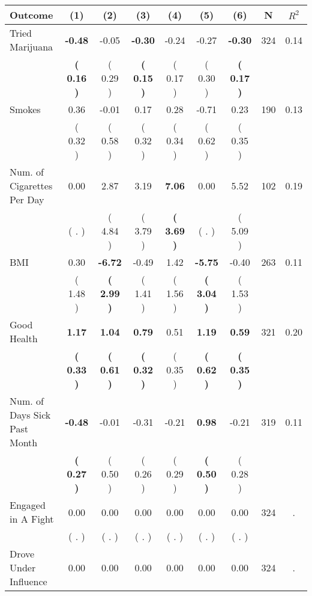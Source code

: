 \begin{tabular}{lcccccccc}
\toprule
 \textbf{Outcome} & \textbf{(1)} & \textbf{(2)} & \textbf{(3)} & \textbf{(4)} & \textbf{(5)} & \textbf{(6)} & \textbf{N} & \textbf{$ R^2$} \\
\midrule
Tried Marijuana & \textbf{    -0.48} &     -0.05 & \textbf{    -0.30} &     -0.24 &     -0.27 & \textbf{    -0.30} & 324 &       0.14 \\ 
 & \textbf{(     0.16 )} & (     0.29 ) & \textbf{(     0.15 )} & (     0.17 ) & (     0.30 ) & \textbf{(     0.17 )} & \\
Smokes &      0.36 &     -0.01 &      0.17 &      0.28 &     -0.71 &      0.23 & 190 &       0.13 \\ 
 & (     0.32 ) & (     0.58 ) & (     0.32 ) & (     0.34 ) & (     0.62 ) & (     0.35 ) & \\
Num. of Cigarettes Per Day &      0.00 &      2.87 &      3.19 & \textbf{     7.06} &      0.00 &      5.52 & 102 &       0.19 \\ 
 & (        . ) & (     4.84 ) & (     3.79 ) & \textbf{(     3.69 )} & (        . ) & (     5.09 ) & \\
BMI &      0.30 & \textbf{    -6.72} &     -0.49 &      1.42 & \textbf{    -5.75} &     -0.40 & 263 &       0.11 \\ 
 & (     1.48 ) & \textbf{(     2.99 )} & (     1.41 ) & (     1.56 ) & \textbf{(     3.04 )} & (     1.53 ) & \\
Good Health & \textbf{     1.17} & \textbf{     1.04} & \textbf{     0.79} &      0.51 & \textbf{     1.19} & \textbf{     0.59} & 321 &       0.20 \\ 
 & \textbf{(     0.33 )} & \textbf{(     0.61 )} & \textbf{(     0.32 )} & (     0.35 ) & \textbf{(     0.62 )} & \textbf{(     0.35 )} & \\
Num. of Days Sick Past Month & \textbf{    -0.48} &     -0.01 &     -0.31 &     -0.21 & \textbf{     0.98} &     -0.21 & 319 &       0.11 \\ 
 & \textbf{(     0.27 )} & (     0.50 ) & (     0.26 ) & (     0.29 ) & \textbf{(     0.50 )} & (     0.28 ) & \\
Engaged in A Fight &      0.00 &      0.00 &      0.00 &      0.00 &      0.00 &      0.00 & 324 &          . \\ 
 & (        . ) & (        . ) & (        . ) & (        . ) & (        . ) & (        . ) & \\
Drove Under Influence &      0.00 &      0.00 &      0.00 &      0.00 &      0.00 &      0.00 & 324 &          . \\ 

\end{tabular}
